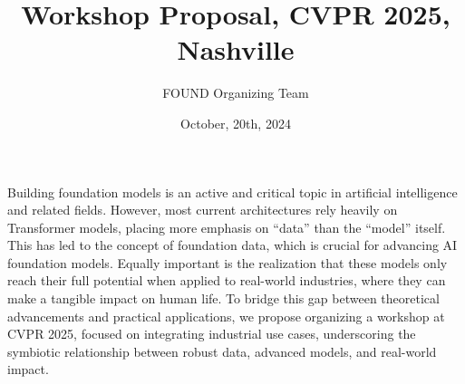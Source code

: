 \documentclass{article}
\title{Workshop Proposal, CVPR 2025, Nashville}
\author{FOUND Organizing Team}
\date{October, 20th, 2024}
\begin{document}
\maketitle


Building foundation models is an active and critical topic in artificial intelligence and related fields. However, most current architectures rely heavily on Transformer models, placing more emphasis on ``data'' than the ``model'' itself. This has led to the concept of foundation data, which is crucial for advancing AI foundation models. Equally important is the realization that these models only reach their full potential when applied to real-world industries, where they can make a tangible impact on human life. To bridge this gap between theoretical advancements and practical applications, we propose organizing a workshop at CVPR 2025, focused on integrating industrial use cases, underscoring the symbiotic relationship between robust data, advanced models, and real-world impact.


\end{document}

